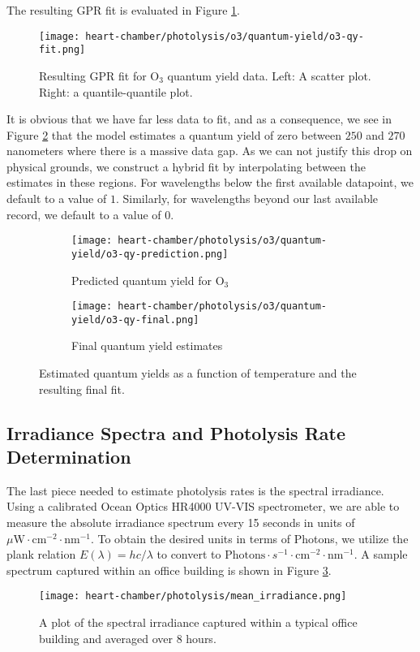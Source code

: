 The resulting GPR fit is evaluated in Figure \ref{fig:qy-o3-fit}.
\begin{figure}[!hbt]
  \centering
  \texttt{[image: heart-chamber/photolysis/o3/quantum-yield/o3-qy-fit.png]}
  \caption{Resulting GPR fit for $\mathrm{O_3}$ quantum yield data. Left: A scatter plot. Right: a quantile-quantile plot.}
  \label{fig:qy-o3-fit}
\end{figure}
It is obvious that we have far less data to fit, and as a consequence, we see in Figure \ref{fig:qy-o3-pred} that the model estimates a quantum yield of zero between $250$ and $270$ nanometers where there is a massive data gap. As we can not justify this drop on physical grounds, we construct a hybrid fit by interpolating between the estimates in these regions. For wavelengths below the first available datapoint, we default to a value of $1$. Similarly, for wavelengths beyond our last available record, we default to a value of $0$.
\begin{figure}[!hbt]
  \begin{subfigure}{.5\textwidth}
    \centering
    \texttt{[image: heart-chamber/photolysis/o3/quantum-yield/o3-qy-prediction.png]}
    \caption{Predicted quantum yield for $\mathrm{O_3}$}
  \end{subfigure}
  \begin{subfigure}{.5\textwidth}
    \centering
    \texttt{[image: heart-chamber/photolysis/o3/quantum-yield/o3-qy-final.png]}
    \caption{Final quantum yield estimates}
  \end{subfigure}
  \caption{Estimated quantum yields as a function of temperature and the resulting final fit.}
  \label{fig:qy-o3-pred}
\end{figure}


\subsection{Irradiance Spectra and Photolysis Rate Determination}

The last piece needed to estimate photolysis rates is the spectral irradiance. Using a calibrated Ocean Optics HR4000 UV-VIS spectrometer, we are able to measure the absolute irradiance spectrum every 15 seconds in units of $\mu\text{W}\cdot\text{cm}^{-2}\cdot\text{nm}^{-1}$. To obtain the desired units in terms of Photons, we utilize the plank relation $E(\lambda)=hc/\lambda$ to convert to $\text{Photons}\cdot{s}^{-1}\cdot\text{cm}^{-2}\cdot\text{nm}^{-1}$. A sample spectrum captured within an office building is shown in Figure \ref{fig:mean-irradiance}.
\begin{figure}[!hbt]
  \centering
  \texttt{[image: heart-chamber/photolysis/mean\_irradiance.png]}
  \caption{A plot of the spectral irradiance captured within a typical office building and averaged over 8 hours.}
  \label{fig:mean-irradiance}
\end{figure}

